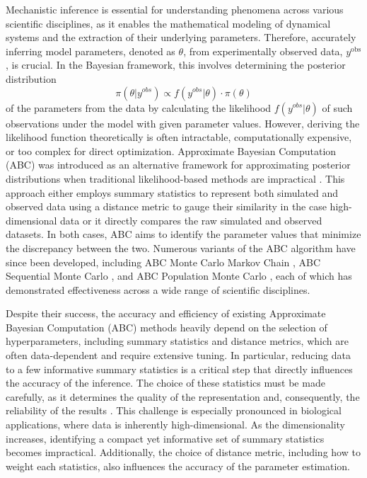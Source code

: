 \documentclass[12pt]{article} %
\begin{document}


Mechanistic inference is essential for understanding phenomena across various scientific disciplines, as it enables the mathematical modeling of dynamical systems and the extraction of their underlying parameters. Therefore, accurately inferring model parameters, denoted as $\theta$, from experimentally observed data, $y^{\text{obs}}$, is crucial. In the Bayesian framework, this involves determining the posterior distribution
$$\pi(\theta | y^{obs}) \propto f(y^{obs} | \theta)\cdot \pi(\theta) $$
of the parameters from the data by calculating the likelihood $f(y^{obs} | \theta)$ of such observations under the model with given parameter values. However, deriving the likelihood function theoretically is often intractable, computationally expensive, or too complex for direct optimization. Approximate Bayesian Computation (ABC) was introduced as an alternative framework for approximating posterior distributions when traditional likelihood-based methods are impractical \citep{tavare1997inferring}. This approach either employs summary statistics to represent both simulated and observed data using a distance metric to gauge their similarity in the case high-dimensional data or it directly compares the raw simulated and observed datasets. In both cases, ABC aims to identify the parameter values that minimize the discrepancy between the two. Numerous variants of the ABC algorithm have since been developed, including ABC Monte Carlo Markov Chain \citep{marjoram2003markov}, ABC Sequential Monte Carlo \citep{toni2009approximate}, and ABC Population Monte Carlo \citep{robert2008adaptivity}, each of which has demonstrated effectiveness across a wide range of scientific disciplines.

Despite their success, the accuracy and efficiency of existing Approximate Bayesian Computation (ABC) methods heavily depend on the selection of hyperparameters, including summary statistics and distance metrics, which are often data-dependent and require extensive tuning. In particular, reducing data to a few informative summary statistics is a critical step that directly influences the accuracy of the inference. The choice of these statistics must be made carefully, as it determines the quality of the representation and, consequently, the reliability of the results \citep{aakesson2021convolutional}. This challenge is especially pronounced in biological applications, where data is inherently high-dimensional. As the dimensionality increases, identifying a compact yet informative set of summary statistics becomes impractical. Additionally, the choice of distance metric, including how to weight each statistics, also influences the accuracy of the parameter estimation.
\end{document}
